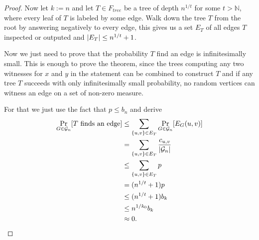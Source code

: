 \begin{proof}
Now let $k:=n$ and let $T\in F_{tree}$ be a tree of depth $n^{1/t}$ for some $t>\mathbb{N}$, where every leaf of $T$ is labeled by some edge. Walk down the tree $T$ from the root by answering negatively to every edge, this gives us a set $E_T$ of all edges $T$ inspected or outputed and $\left|{E_T}\right|\leq n^{1/t}+1$.

Now we just need to prove that the probability $T$ find an edge is infinitesimally small. This is enough to prove the theorem, since the trees computing any two witnesses for $x$ and $y$ in the statement can be combined to construct $T$ and if any tree $T$ succeeds with only infinitesimally small probability, no random vertices can witness an edge on a set of non-zero measure.

For that we just use the fact that $p\leq b_n$ and derive 
\begin{align}
\Pr_{G\in\mathcal{G}_n}[T\text{ finds an edge}]&\leq \sum_{\{u,v\}\in E_T} \Pr_{G\in \mathcal{G}_n}[E_G(u,v)]\\
&=\sum_{\{u,v\}\in E_T} \frac{c_{u,v}}{\left|{\mathcal{G}_n}\right|}\\
&\leq\sum_{\{u,v\}\in E_T} p\\
&=(n^{1/t}+1)p\\
&\leq(n^{1/t}+1)b_k\\
&\leq n^{1/k_0}b_k\\
&\approx 0.
\end{align}
\end{proof}
